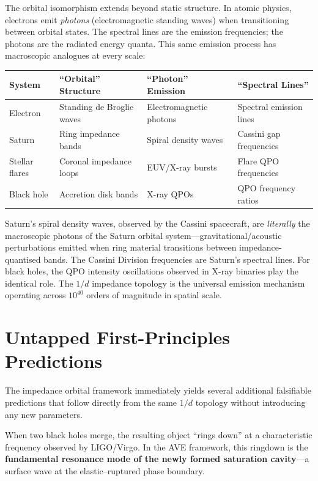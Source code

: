 The orbital isomorphism extends beyond static structure. In atomic physics, electrons emit \textit{photons} (electromagnetic standing waves) when transitioning between orbital states. The spectral lines are the emission frequencies; the photons are the radiated energy quanta. This same emission process has macroscopic analogues at every scale:

\begin{center}
\renewcommand{\arraystretch}{1.3}
\begin{tabular}{l l l l}
\toprule
\textbf{System} & \textbf{``Orbital'' Structure} & \textbf{``Photon'' Emission} & \textbf{``Spectral Lines''} \\
\midrule
Electron & Standing de Broglie waves & Electromagnetic photons & Spectral emission lines \\
Saturn & Ring impedance bands & Spiral density waves & Cassini gap frequencies \\
Stellar flares & Coronal impedance loops & EUV/X-ray bursts & Flare QPO frequencies \\
Black hole & Accretion disk bands & X-ray QPOs & QPO frequency ratios \\
\bottomrule
\end{tabular}
\end{center}

Saturn's spiral density waves, observed by the Cassini spacecraft, are \textit{literally} the macroscopic photons of the Saturn orbital system---gravitational/acoustic perturbations emitted when ring material transitions between impedance-quantised bands. The Cassini Division frequencies are Saturn's spectral lines. For black holes, the QPO intensity oscillations observed in X-ray binaries play the identical role. The $1/d$ impedance topology is the universal emission mechanism operating across $10^{40}$ orders of magnitude in spatial scale.

\section{Untapped First-Principles Predictions}

The impedance orbital framework immediately yields several additional falsifiable predictions that follow directly from the same $1/d$ topology without introducing any new parameters.

When two black holes merge, the resulting object ``rings down'' at a characteristic frequency observed by LIGO/Virgo. In the AVE framework, this ringdown is the \textbf{fundamental resonance mode of the newly formed saturation cavity}---a surface wave at the elastic--ruptured phase boundary.

